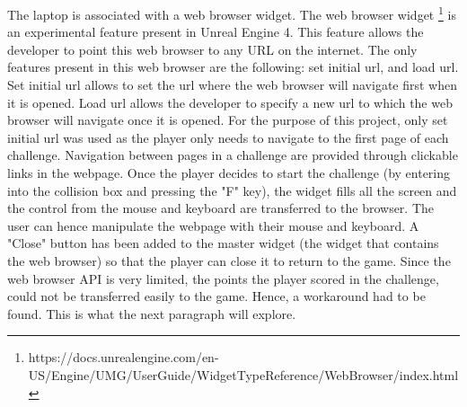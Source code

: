 \documentclass{l4proj}
\begin{document}
The laptop is associated with a web browser widget. 
The web browser widget \footnote{https://docs.unrealengine.com/en-US/Engine/UMG/UserGuide/WidgetTypeReference/WebBrowser/index.html} 
is an experimental feature present in Unreal Engine 4.
This feature allows the developer to point this web browser to any URL on the internet.
The only features present in this web browser are the following: set initial url, and load url.
Set initial url allows to set the url where the web browser will navigate first when it is opened.
Load url allows the developer to specify a new url to which the web browser will navigate once it is opened.
For the purpose of this project, only set initial url was used as the player only needs to navigate to the first page of each challenge.
Navigation between pages in a challenge are provided through clickable links in the webpage.
Once the player decides to start the challenge (by entering into the collision box and pressing the "F" key), 
the widget fills all the screen and the control from the mouse and keyboard are transferred to the browser.
The user can hence manipulate the webpage with their mouse and keyboard. 
A "Close" button has been added to the master widget (the widget that contains the web browser) so that
the player can close it to return to the game.
Since the web browser API is very limited, the points the player scored in the challenge, 
could not be transferred easily to the game. Hence, a workaround had to be found.
This is what the next paragraph will explore.
\end{document}
